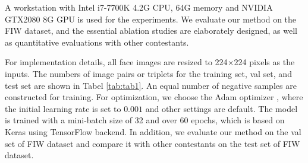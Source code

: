 \documentclass[a4paper, 10pt, conference]{ieeeconf}      %
\begin{document}
A workstation with Intel i7-7700K 4.2G CPU, 64G memory and NVIDIA GTX2080 8G GPU is used for the experiments. We evaluate our method on the FIW dataset, and the essential ablation studies are elaborately designed, as well as quantitative evaluations with other contestants. 

For implementation details, all face images are resized to 224$\times$224 pixels as the inputs. The numbers of image pairs or triplets for the training set, val set, and test set are shown in Tabel \ref{tab:tab1}. An equal number of negative samples are constructed for training. For optimization, we choose the Adam optimizer \cite{c22}, where the initial learning rate is set to $0.001$ and other settings are default. The model is trained with a mini-batch size of 32 and over 60 epochs, which is based on Keras using TensorFlow backend. In addition, we evaluate our method on the val set of FIW dataset and compare it with other contestants on the test set of FIW dataset.
\end{document}
